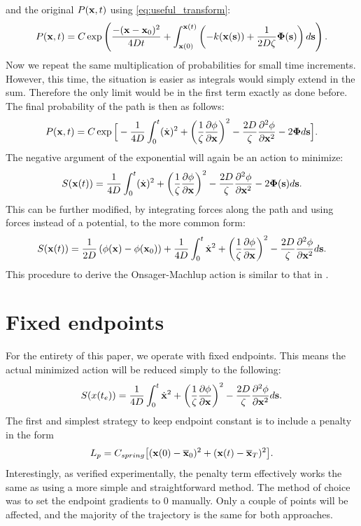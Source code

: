 and the original $P(\mathbf{x},t)$ using \eqref{eq:useful_transform}:
\begin{equation}
    P(\mathbf{x},t) = C \exp \left( \frac{- ( \mathbf{x} - \mathbf{x}_0)^2}{4 D t} +\int_{\mathbf{x}(0)}^{\mathbf{x}(t)} \left(- k(\mathbf{x}(\mathbf{s}))+ \frac{1}{2D \zeta} \mathbf{\Phi}(\mathbf{s}) \right) d\mathbf{s} \right).
\end{equation}
Now we repeat the same multiplication of probabilities for small time increments. However, this time, the situation is easier as integrals would simply extend in the sum. Therefore the only limit would be in the first term exactly as done before. The final probability of the path is then as follows:
\begin{equation}
    P(\mathbf{x}, t) = C  \exp \Big[- \frac{1}{4D} \int_0^t  (\dot{\mathbf{x}})^2 + \left(\frac{1}{\zeta} \frac{\partial \phi}{\partial \mathbf{x}} \right)^2 - \frac{2D}{\zeta}\frac{\partial^2 \phi}{\partial \mathbf{x}^2} - 2 \mathbf{\Phi} d\mathbf{s} \Big].
\end{equation}
The negative argument of the exponential will again be an action to minimize:
\begin{equation}
    S(\mathbf{x}(t)) = \frac{1}{4D} \int_0^t  (\dot{\mathbf{x}})^2 + \left(\frac{1}{\zeta} \frac{\partial \phi}{\partial \mathbf{x}} \right)^2 - \frac{2D}{\zeta}\frac{\partial^2 \phi}{\partial \mathbf{x}^2} - 2\mathbf{\Phi}(\mathbf{s}) d\mathbf{s}.
\end{equation}
This can be further modified, by integrating forces along the path and using forces instead of a potential, to the more common form:
\begin{equation}
    S(\mathbf{x}(t)) = \frac{1}{2D}\left(\phi(\mathbf{x}) - \phi(\mathbf{x}_0)\right) + \frac{1}{4D} \int_0^t  \dot{\mathbf{x}}^2 + \left(\frac{1}{\zeta} \frac{\partial \phi}{\partial \mathbf{x}} \right)^2 - \frac{2D}{\zeta}\frac{\partial^2 \phi}{\partial \mathbf{x}^2}  d\mathbf{s}.
\end{equation}
This procedure to derive the Onsager-Machlup action is similar to that in \cite{mauri}.

\section{Fixed endpoints}
For the entirety of this paper, we operate with fixed endpoints. This means the actual minimized action will be reduced simply to the following:
\begin{equation}
    S(x(t_e)) = \frac{1}{4D} \int_0^t  \dot{\mathbf{x}}^2 + \left(\frac{1}{\zeta} \frac{\partial \phi}{\partial \mathbf{x}} \right)^2 - \frac{2D}{\zeta}\frac{\partial^2 \phi}{\partial \mathbf{x}^2}  d\mathbf{s}.
\end{equation} 
The first and simplest strategy to keep endpoint constant is to include a penalty in the form
\begin{equation}
    L_p = C_{spring} \big[ (\mathbf{x}(0) - \overline{\mathbf{x}}_0)^2 + (\mathbf{x}(t) - \overline{\mathbf{x}}_T)^2 \big].
\end{equation}
Interestingly, as verified experimentally, the penalty term effectively works the same as using a more simple and straightforward method. The method of choice was to set the endpoint gradients to 0 manually. Only a couple of points will be affected, and the majority of the trajectory is the same for both approaches.
